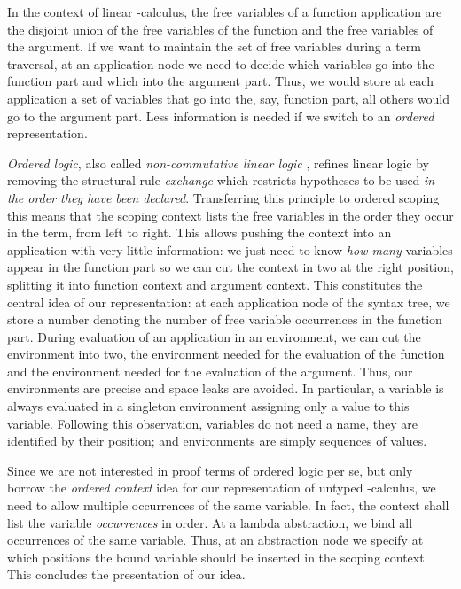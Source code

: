 \documentclass[submission,copyright,creativecommons]{eptcs}
\begin{document}
In the context of linear -calculus, the free
variables of a function application are the disjoint union of the free
variables of the function and the free variables of the argument.  If
we want to maintain the set of free variables during a term traversal,
at an application node we need to decide which variables go into the
function part and which into the argument part.  Thus, we would store
at each application a set of variables that go into the, say, function
part, all others would go to the argument part.  Less information is
needed if we switch to an \emph{ordered} representation.

\emph{Ordered logic}, also called \emph{non-commutative linear logic}
\cite{polakowPfenning:tlca99}, refines linear logic by removing the
structural rule \emph{exchange} which restricts hypotheses to be used
\emph{in the order they have been declared}.  Transferring this
principle to ordered scoping this means that the scoping context lists
the free variables in the order they occur in the term, from left to
right.  This allows pushing the context into an application with very
little information: we just need to know \emph{how many} variables
appear in the function part so we can cut the context in two at the
right position, splitting it into function context and argument
context.  This constitutes the central idea of our representation: at
each application node of the syntax tree, we store a number denoting
the number of free variable occurrences in the function part.  During
evaluation of an application in an environment, we can cut the
environment into two, the environment needed for the evaluation of the
function and the environment needed for the evaluation of the
argument.  Thus, our environments are precise and space leaks are
avoided.  In particular, a variable is always evaluated in a singleton
environment assigning only a value to this variable.  Following this
observation, variables do not need a name, they are identified by
their position; and environments are simply sequences of values.

Since we are not interested in proof terms of ordered logic per se,
but only borrow the \emph{ordered context} idea for our
representation of untyped -calculus, 
we need to allow multiple occurrences of the same
variable.  In fact, the context shall list the variable
\emph{occurrences} in order.  At a lambda abstraction, we bind all
occurrences of the same variable.  Thus, at an abstraction node we
specify at which positions the bound variable should be inserted in
the scoping context.  This concludes the presentation of our idea.  
\end{document}
